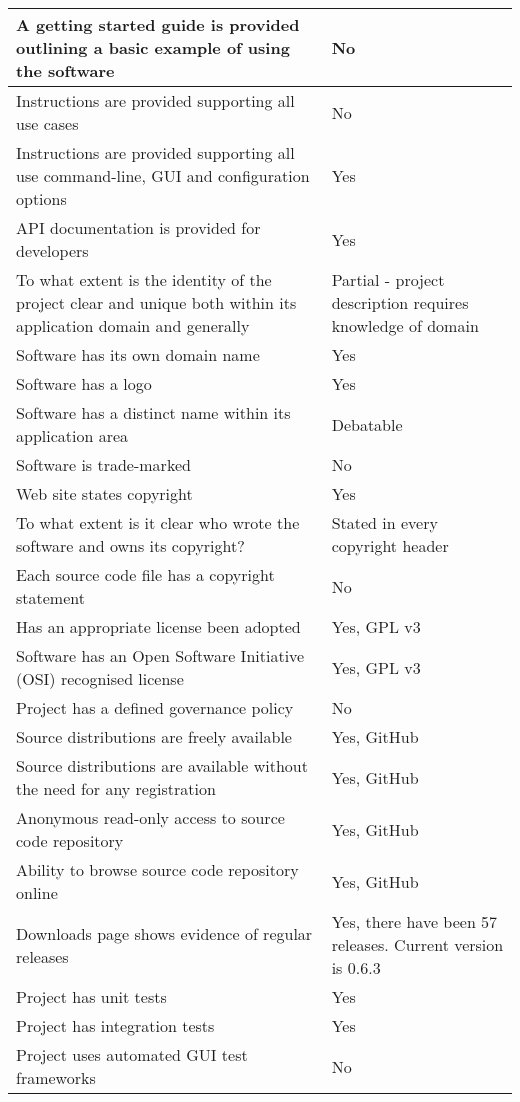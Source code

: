 \begin{center}
\begin{longtable}{ | L{11cm} | L{4cm} | }
A getting started guide is provided outlining a basic example of using the software & No\\\hline
Instructions are provided supporting all use cases & No\\\hline
Instructions are provided supporting all use command-line, GUI and configuration options & Yes\\\hline
API documentation is provided for developers & Yes\\\hline
To what extent is the identity of the project clear and unique both within its application domain and generally & Partial - project description requires knowledge of domain\\\hline
Software has its own domain name & Yes\\\hline
Software has a logo & Yes\\\hline
Software has a distinct name within its application area & Debatable\\\hline
Software is trade-marked & No\\\hline
Web site states copyright & Yes\\\hline
To what extent is it clear who wrote the software and owns its copyright? & Stated in every copyright header\\\hline
Each source code file has a copyright statement & No\\\hline
Has an appropriate license been adopted & Yes, GPL v3\\\hline
Software has an Open Software Initiative (OSI) recognised license & Yes, GPL v3\\\hline
Project has a defined governance policy & No\\\hline
Source distributions are freely available & Yes, GitHub\\\hline
Source distributions are available without the need for any registration & Yes, GitHub\\\hline
Anonymous read-only access to source code repository & Yes, GitHub\\\hline
Ability to browse source code repository online & Yes, GitHub\\\hline
Downloads page shows evidence of regular releases & Yes, there have been 57 releases. Current version is 0.6.3\\\hline
Project has unit tests & Yes\\\hline
Project has integration tests & Yes\\\hline
Project uses automated GUI test frameworks & No\\\hline

\end{longtable}
\end{center}
